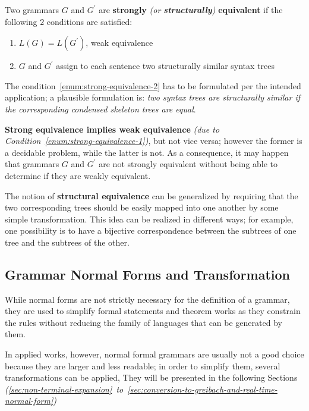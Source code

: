 \documentclass[english]{article}
\begin{document}
\begin{definition}
  \label{def:strong-equivalence}
  Two grammars \(G\) and \(G^\prime\) are \textbf{strongly} \textit{(or \textbf{structurally})} \textbf{equivalent} if the following \(2\) conditions are satisfied:

  \begin{enumerate}[label=\Alph*., ref=(\Alph*)]
    \item\label{enum:strong-equivalence-1} \(L(G) = L(G^\prime)\), weak equivalence
    \item\label{enum:strong-equivalence-2} \(G\) and \(G^\prime\) assign to each sentence two structurally similar syntax trees
  \end{enumerate}
\end{definition}

The condition~\ref{enum:strong-equivalence-2} has to be formulated per the intended application;
a plausible formulation is:
\textit{two syntax trees are structurally similar if the corresponding condensed skeleton trees are equal}.

\bigskip
\textbf{Strong equivalence implies weak equivalence} \textit{(due to Condition~\ref{enum:strong-equivalence-1})}, but not vice versa;
however the former is a decidable problem, while the latter is not.
As a consequence, it may happen that grammars \(G\) and \(G^\prime\) are not strongly equivalent without being able to determine if they are weakly equivalent.

\bigskip
The notion of \textbf{structural equivalence} can be generalized by requiring that the two corresponding trees should be easily mapped into one another by some simple transformation.
This idea can be realized in different ways;
for example, one possibility is to have a bijective correspondence between the subtrees of one tree and the subtrees of the other.

\subsection{Grammar Normal Forms and Transformation}

While normal forms are not strictly necessary for the definition of a grammar, they are used to simplify formal statements and theorem works as they constrain the rules without reducing the family of languages that can be generated by them.

In applied works, however, normal formal grammars are usually not a good choice because they are larger and less readable;
in order to simplify them, several transformations can be applied,
They will be presented in the following Sections \textit{(\ref{sec:non-terminal-expansion}~to~\ref{sec:conversion-to-greibach-and-real-time-normal-form})}
\end{document}
